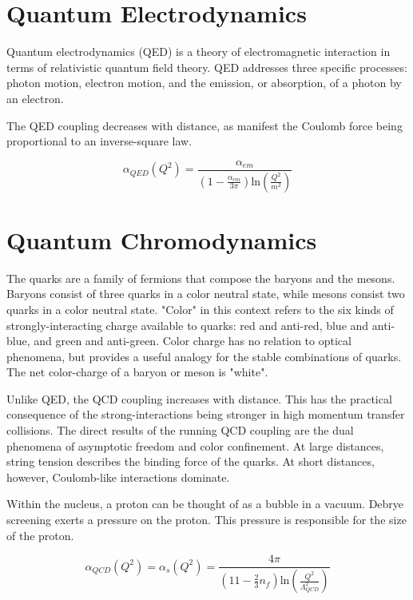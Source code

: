 \section{Quantum Electrodynamics}

Quantum electrodynamics (QED) is a theory of electromagnetic interaction in terms of relativistic quantum field theory. QED addresses three specific processes: photon motion, electron motion, and the emission, or absorption, of a photon by an electron.

The QED coupling decreases with distance, as manifest the Coulomb force being proportional to an inverse-square law. 

\begin{equation}
\alpha_{QED}(Q^2) = \frac{ \alpha_{em}}{(1 - \frac{\alpha_{em}}{3\pi})\mathrm{ln}(\frac{Q^2}{m^2}) }
\end{equation}

\section{Quantum Chromodynamics}

The quarks are a family of fermions that compose the baryons and the mesons. Baryons consist of three quarks in a color neutral state, while mesons consist two quarks in a color neutral state. "Color" in this context refers to the six kinds of strongly-interacting charge available to quarks: red and anti-red, blue and anti-blue, and green and anti-green. Color charge has no relation to optical phenomena, but provides a useful analogy for the stable combinations of quarks. The net color-charge of a baryon or meson is "white".

Unlike QED, the QCD coupling increases with distance. This has the practical consequence of the strong-interactions being stronger in high momentum transfer collisions. The direct results of the running QCD coupling are the dual phenomena of asymptotic freedom and color confinement. At large distances, string tension describes the binding force of the quarks. At short distances, however, Coulomb-like interactions dominate.

Within the nucleus, a proton can be thought of as a bubble in a vacuum. Debrye screening exerts a pressure on the proton. This pressure is responsible for the size of the proton. 

\begin{equation}
\alpha_{QCD}(Q^2) = \alpha_{s}(Q^2) = \frac{4 \pi }{(11 - \frac{2}{3}n_f)\mathrm{ln}(\frac{Q^2}{\Lambda^2_{QCD}}) }
\end{equation}



